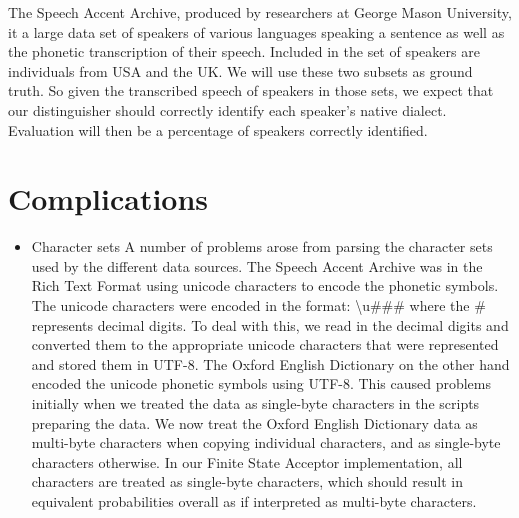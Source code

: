 \documentclass[11pt, letterpaper, oneside]{article}
\begin{document}
	The Speech Accent Archive, produced by researchers at George Mason University, it a large data set of speakers of various languages speaking a sentence as well as the phonetic transcription of their speech.
	Included in the set of speakers are individuals from USA and the UK.
	We will use these two subsets as ground truth. So given the transcribed speech of speakers in those sets, we expect that our distinguisher should correctly identify each speaker's native dialect.
	Evaluation will then be a percentage of speakers correctly identified.
	

	

\section{Complications}

\begin{itemize}
\item Character sets
    A number of problems arose from parsing the character sets used by the different data sources.
    The Speech Accent Archive was in the Rich Text Format using unicode characters to encode the phonetic symbols.
    The unicode characters were encoded in the format: \textbackslash u### where the # represents decimal digits.
    To deal with this, we read in the decimal digits and converted them to the appropriate unicode characters that were represented and stored them in UTF-8.
    The Oxford English Dictionary on the other hand encoded the unicode phonetic symbols using UTF-8.
    This caused problems initially when we treated the data as single-byte characters in the scripts preparing the data.
    We now treat the Oxford English Dictionary data as multi-byte characters when copying individual characters, and as single-byte characters otherwise.
    In our Finite State Acceptor implementation, all characters are treated as single-byte characters, which should result in equivalent probabilities overall as if interpreted as multi-byte characters.


\end{itemize}
\end{document}
